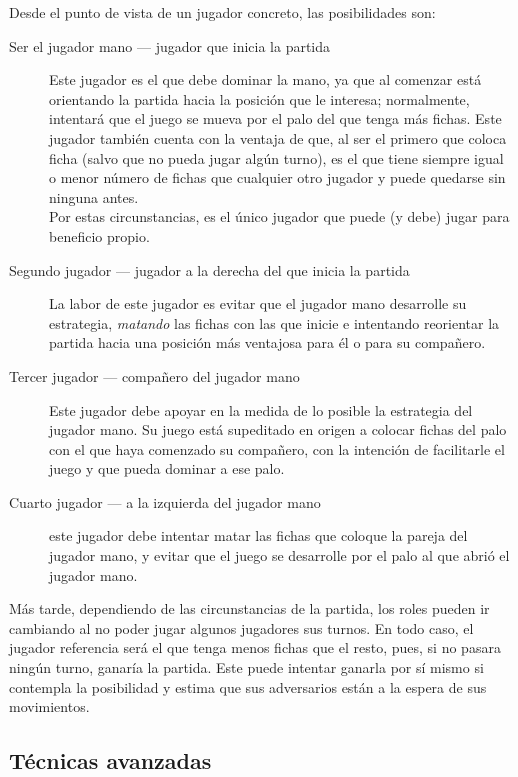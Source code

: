 Desde el punto de vista de un jugador concreto, las posibilidades son: \\
\begin{description}
    \item[Ser el jugador mano --- jugador que inicia la partida] Este jugador es el que debe dominar la mano, ya
        que al comenzar está orientando la partida hacia la posición que le interesa; normalmente, intentará
        que el juego se mueva por el palo del que tenga más fichas. Este jugador también cuenta
        con la ventaja de que, al ser el primero que coloca ficha (salvo que no pueda jugar algún turno), es el que tiene siempre igual o menor número
        de fichas que cualquier otro jugador y puede quedarse sin ninguna antes. \\
        Por estas circunstancias, es el único jugador que puede (y debe) jugar para beneficio propio.
    \item[Segundo jugador --- jugador a la derecha del que inicia la partida] La labor de este jugador es
        evitar que el jugador mano desarrolle su estrategia, \emph{matando} las fichas con las que inicie e intentando
        reorientar la partida hacia una posición más ventajosa para él o para su compañero.
    \item[Tercer jugador --- compañero del jugador mano] Este jugador debe apoyar en la medida de lo posible
        la estrategia del jugador mano. Su juego está supeditado en origen a colocar fichas del palo con el
        que haya comenzado su compañero, con la intención de facilitarle el juego y que pueda dominar a ese palo. 
    \item[Cuarto jugador --- a la izquierda del jugador mano] este jugador debe intentar matar las fichas que coloque
        la pareja del jugador mano, y evitar que el juego se desarrolle por el palo al que abrió el jugador mano.
\end{description}

Más tarde, dependiendo de las circunstancias de la partida, los roles
pueden ir cambiando al no poder jugar algunos jugadores sus turnos. En
todo caso, el jugador referencia será el que tenga menos fichas que el
resto, pues, si no pasara ningún turno, ganaría la partida. Este puede
intentar ganarla por sí mismo si contempla la posibilidad y estima que
sus adversarios están a la espera de sus movimientos.


\subsection{Técnicas avanzadas}


